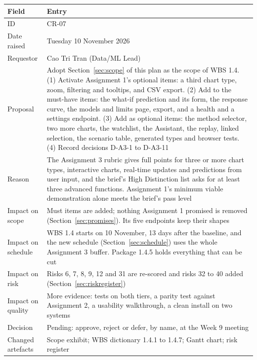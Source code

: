 \begin{center}
\small
\begin{tabularx}{\textwidth}{@{}L{3.0cm}Y@{}}
\toprule
\textbf{Field} & \textbf{Entry} \\
\midrule
ID & CR-07 \\
Date raised & Tuesday 10 November 2026 \\
Requestor & Cao Tri Tran (Data/ML Lead) \\
Proposal & Adopt Section~\ref{sec:scope} of this plan as the scope of WBS 1.4. (1) Activate Assignment 1's optional items: a third chart type, zoom, filtering and tooltips, and CSV export. (2) Add to the must-have items: the what-if prediction and its form, the response curve, the models and limits page, export, and a health and a settings endpoint. (3) Add as optional items: the method selector, two more charts, the watchlist, the Assistant, the replay, linked selection, the scenario table, generated types and browser tests. (4) Record decisions D-A3-1 to D-A3-11 \\
Reason & The Assignment 3 rubric gives full points for three or more chart types, interactive charts, real-time updates and predictions from user input, and the brief's High Distinction list asks for at least three advanced functions. Assignment 1's minimum viable demonstration alone meets the brief's pass level \\
Impact on scope & Must items are added; nothing Assignment 1 promised is removed (Section~\ref{sec:promises}). Its five endpoints keep their shapes \\
Impact on schedule & WBS 1.4 starts on 10 November, 13 days after the baseline, and the new schedule (Section~\ref{sec:schedule}) uses the whole Assignment 3 buffer. Package 1.4.5 holds everything that can be cut \\
Impact on risk & Risks 6, 7, 8, 9, 12 and 31 are re-scored and risks 32 to 40 added (Section~\ref{sec:riskregister}) \\
Impact on quality & More evidence: tests on both tiers, a parity test against Assignment 2, a usability walkthrough, a clean install on two systems \\
Decision & Pending: approve, reject or defer, by name, at the Week 9 meeting \\
Changed artefacts & Scope exhibit; WBS dictionary 1.4.1 to 1.4.7; Gantt chart; risk register \\
\bottomrule
\end{tabularx}
\end{center}

